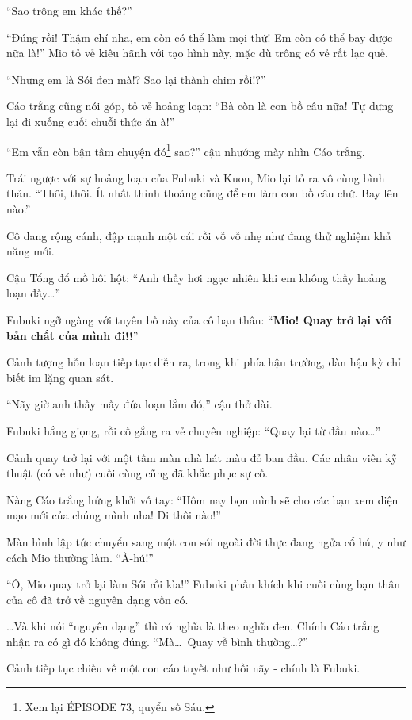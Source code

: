 \documentclass[../main.tex]{subfiles}
\begin{document}
``Sao trông em khác thế?''

``Đúng rồi! Thậm chí nha, em còn có thể làm mọi thứ! Em còn có thể bay được nữa là!'' Mio tỏ vẻ kiêu hãnh với tạo hình này, mặc dù trông có vẻ rất lạc quẻ.

``Nhưng em là Sói đen mà!? Sao lại thành chim rồi!?''

Cáo trắng cũng nói góp, tỏ vẻ hoảng loạn: ``Bà còn là con bồ câu nữa! Tự dưng lại đi xuống cuối chuỗi thức ăn à!''

``Em vẫn còn bận tâm chuyện đó\footnote{Xem lại {\flaregothic ÉPISODE 73}, quyển số Sáu.} sao?'' cậu nhướng mày nhìn Cáo trắng.

Trái ngược với sự hoảng loạn của Fubuki và Kuon, Mio lại tỏ ra vô cùng bình thản. ``Thôi, thôi. Ít nhất thỉnh thoảng cũng để em làm con bồ câu chứ. Bay lên nào.''

Cô dang rộng cánh, đập mạnh một cái rồi vỗ vỗ nhẹ như đang thử nghiệm khả năng mới.

Cậu Tổng đổ mồ hôi hột: ``Anh thấy hơi ngạc nhiên khi em không thấy hoảng loạn đấy\dots''

Fubuki ngỡ ngàng với tuyên bố này của cô bạn thân: ``\textbf{Mio! Quay trở lại với bản chất của mình đi!!}''

Cảnh tượng hỗn loạn tiếp tục diễn ra, trong khi phía hậu trường, dàn hậu kỳ chỉ biết im lặng quan sát.

\ct

``Nãy giờ anh thấy mấy đứa loạn lắm đó,'' cậu thở dài.

Fubuki hắng giọng, rồi cố gắng ra vẻ chuyên nghiệp: ``Quay lại từ đầu nào\dots''

Cảnh quay trở lại với một tấm màn nhà hát màu đỏ ban đầu. Các nhân viên kỹ thuật (có vẻ như) cuối cùng cũng đã khắc phục sự cố.


Nàng Cáo trắng hứng khởi vỗ tay: ``Hôm nay bọn mình sẽ cho các bạn xem diện mạo mới của chúng mình nha! Đi thôi nào!''

Màn hình lập tức chuyển sang một con sói ngoài đời thực đang ngửa cổ hú, y như cách Mio thường làm. ``À-hú!''

``Ô, Mio quay trở lại làm Sói rồi kìa!'' Fubuki phấn khích khi cuối cùng bạn thân của cô đã trở về nguyên dạng vốn có.

\dots Và khi nói ``nguyên dạng'' thì có nghĩa là theo nghĩa đen. Chính Cáo trắng nhận ra có gì đó không đúng. ``Mà\dots\ Quay về bình thường\dots?''

Cảnh tiếp tục chiếu về một con cáo tuyết như hồi nãy - chính là Fubuki.
\end{document}
